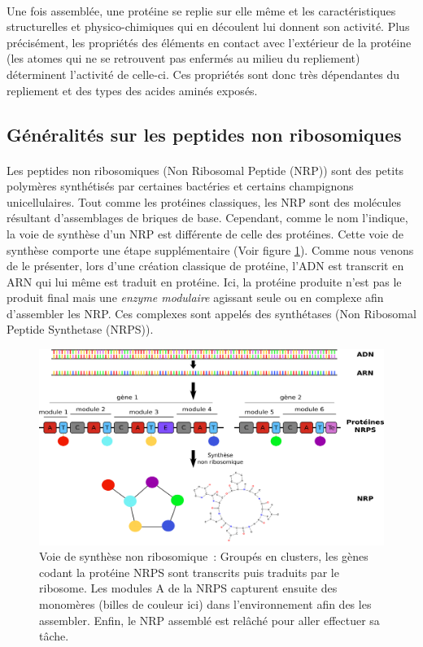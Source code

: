 \documentclass[12pt,french,twoside]{report}
\begin{document}
\paragraph{}Une fois assemblée, une protéine se replie sur elle même et les caractéristiques structurelles et physico-chimiques qui en découlent lui donnent son activité.
Plus précisément, les propriétés des éléments en contact avec l'extérieur de la protéine (les atomes qui ne se retrouvent pas enfermés au milieu du repliement) déterminent l'activité de celle-ci.
Ces propriétés sont donc très dépendantes du repliement et des types des acides aminés exposés.



\subsection{Généralités sur les peptides non ribosomiques}
\paragraph{}Les peptides non ribosomiques (Non Ribosomal Peptide (NRP)) sont des petits polymères synthétisés par certaines bactéries et certains champignons unicellulaires.
Tout comme les protéines classiques, les NRP sont des molécules résultant d'assemblages de briques de base.
Cependant, comme le nom l'indique, la voie de synthèse d'un NRP est différente de celle des protéines.
Cette voie de synthèse comporte une étape supplémentaire (Voir figure \ref{global}).
Comme nous venons de le présenter, lors d'une création classique de protéine, l'ADN est transcrit en ARN qui lui même est traduit en protéine.
Ici, la protéine produite n'est pas le produit final mais une \textit{enzyme modulaire} agissant seule ou en complexe afin d'assembler les NRP.
Ces complexes sont appelés des synthétases (Non Ribosomal Peptide Synthetase (NRPS)).

\begin{figure}[h!]
  \begin{center}
    \includegraphics[width=450px]{Figures/bio/Intro/synthese.png}
    \caption{\label{global}Voie de synthèse non ribosomique~:
    Groupés en clusters, les gènes codant la protéine NRPS sont transcrits puis traduits par le ribosome.
    Les modules A de la NRPS capturent ensuite des monomères (billes de couleur ici) dans l'environnement afin des les assembler.
    Enfin, le NRP assemblé est relâché pour aller effectuer sa tâche.
    }
  \end{center}
\end{figure}
\end{document}
